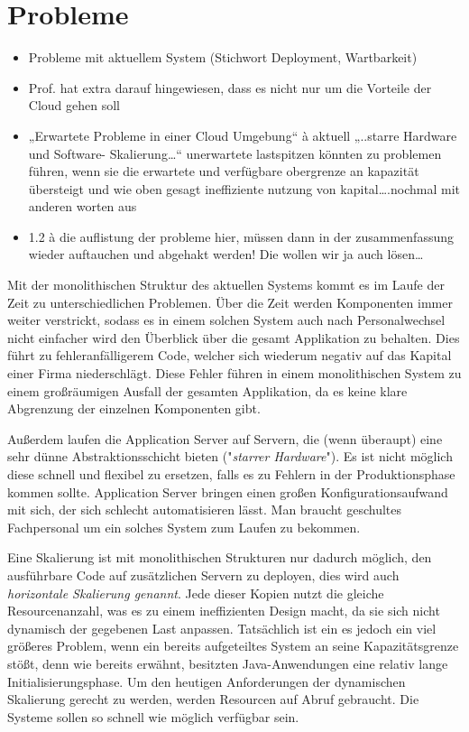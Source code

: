 \section{Probleme}



\begin{itemize}
  \item Probleme mit aktuellem System (Stichwort Deployment, Wartbarkeit)
  \item Prof. hat extra darauf hingewiesen, dass es nicht nur um die Vorteile der Cloud gehen soll
  \item „Erwartete Probleme in einer Cloud Umgebung“ à aktuell „..starre Hardware und Software- Skalierung…“ unerwartete lastspitzen könnten zu problemen führen, wenn sie die erwartete und verfügbare obergrenze an kapazität übersteigt und wie oben gesagt ineffiziente nutzung von kapital….nochmal mit anderen worten aus 
  \item  1.2 à die auflistung der probleme hier, müssen dann in der zusammenfassung wieder auftauchen und abgehakt werden! Die wollen wir ja auch lösen…
\end{itemize}

Mit der monolithischen Struktur des aktuellen Systems kommt es im Laufe der Zeit zu unterschiedlichen Problemen. Über die Zeit werden Komponenten immer weiter verstrickt, sodass es in einem solchen System auch nach Personalwechsel nicht einfacher wird den Überblick über die gesamt Applikation zu behalten. Dies führt zu fehleranfälligerem Code, welcher sich wiederum negativ auf das Kapital einer Firma niederschlägt. Diese Fehler führen in einem monolithischen System zu einem großräumigen Ausfall der gesamten Applikation, da es keine klare Abgrenzung der einzelnen Komponenten gibt. 

Außerdem laufen die Application Server auf Servern, die (wenn überaupt) eine sehr dünne Abstraktionsschicht bieten ("\emph{starrer Hardware}"). Es ist nicht möglich diese schnell und flexibel zu ersetzen, falls es zu Fehlern in der Produktionsphase kommen sollte. Application Server bringen einen großen Konfigurationsaufwand mit sich, der sich schlecht automatisieren lässt. Man braucht geschultes Fachpersonal um ein solches System zum Laufen zu bekommen.

Eine Skalierung ist mit monolithischen Strukturen nur dadurch möglich, den ausführbare Code auf zusätzlichen Servern zu deployen, dies wird auch \emph{horizontale Skalierung genannt}. Jede dieser Kopien nutzt die gleiche Resourcenanzahl, was es zu einem ineffizienten Design macht, da sie sich nicht dynamisch der gegebenen Last anpassen. Tatsächlich ist ein es jedoch ein viel größeres Problem, wenn ein bereits aufgeteiltes System an seine Kapazitätsgrenze stößt, denn wie bereits erwähnt, besitzten Java-Anwendungen eine relativ lange Initialisierungsphase. Um den heutigen Anforderungen der dynamischen Skalierung gerecht zu werden, werden Resourcen auf Abruf gebraucht. Die Systeme sollen so schnell wie möglich verfügbar sein. 
